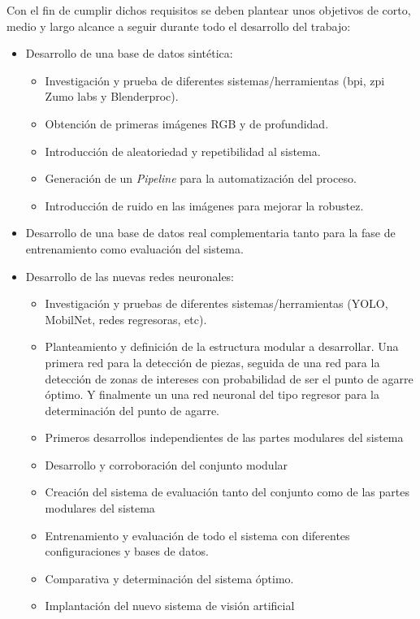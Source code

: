 Con el fin de cumplir dichos requisitos se deben plantear unos objetivos de corto, medio y largo alcance a seguir durante todo el desarrollo del trabajo:

\begin{itemize}
	\item Desarrollo de una base de datos sintética:
	\begin{itemize}
		\item Investigación y prueba de diferentes sistemas/herramientas (bpi, zpi Zumo labs y Blenderproc).
		\item Obtención de primeras imágenes RGB y de profundidad.
		\item Introducción de aleatoriedad y repetibilidad al sistema.
		\item Generación de un \textit{Pipeline} para la automatización del proceso.
		\item Introducción de ruido en las imágenes para mejorar la robustez.
	\end{itemize}
	\item Desarrollo de una base de datos real complementaria tanto para la fase de entrenamiento como evaluación del sistema.
	\item Desarrollo de las nuevas redes neuronales:
	\begin{itemize}
		\item Investigación y pruebas de diferentes sistemas/herramientas (YOLO, MobilNet, redes regresoras, etc).
		\item Planteamiento y definición de la estructura modular a desarrollar. Una primera red para la detección de piezas, seguida de una red para la detección de zonas de intereses con probabilidad de ser el punto de agarre óptimo. Y finalmente un una red neuronal del tipo regresor para la determinación del punto de agarre. 
		\item Primeros desarrollos independientes de las partes modulares del sistema
		\item Desarrollo y corroboración del conjunto modular
		\item Creación del sistema de evaluación tanto del conjunto como de las partes modulares del sistema
		\item Entrenamiento y evaluación de todo el sistema con diferentes configuraciones y bases de datos.
		\item Comparativa y determinación del sistema óptimo.
		\item Implantación del nuevo sistema de visión artificial
	\end{itemize}
\end{itemize}

